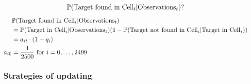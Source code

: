 \documentclass[letter]{article}
\begin{document}
\begin{enumerate}
	\begin{align}
	\mathbb{P} \text{(Target found in Cell$ _i | $Observations$_t $)?}
	\end{align}
	\begin{align*}
		&\mathbb{P} \text{(Target found in Cell$ _i | $Observations$_t $)} \\
		&= \mathbb{P} \text{(Target in Cell$ _i | $Observations$_t $)}(1-\mathbb{P} \text{(Target not found in Cell$ _i | $Target in Cell$ _i$)}) \\
		&= a_{it} \cdot (1 - q_i) \\
		a_{i0} &= \frac{1}{2500} \text{ for } i = 0, \dots, 2499 
	\end{align*}
	
\end{enumerate}

\subsubsection{Strategies of updating}
\label{sec:1-1-Strategies of updating}
\end{document}
